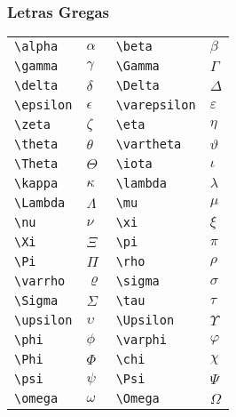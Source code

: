\documentclass{gjvnq-livreto}
\begin{document}
\subsubsection{Letras Gregas}
\begin{codeBox}
\begin{longtable}{ll|ll}
\verb|\alpha| & $\alpha$ & \verb|\beta| & $\beta$ \\
\verb|\gamma| & $\gamma$ & \verb|\Gamma| & $\Gamma$ \\
\verb|\delta| & $\delta$ & \verb|\Delta| & $\Delta$ \\
\verb|\epsilon| & $\epsilon$ & \verb|\varepsilon| & $\varepsilon$ \\
\verb|\zeta| & $\zeta$ & \verb|\eta| & $\eta$ \\
\verb|\theta| & $\theta$ & \verb|\vartheta| & $\vartheta$\\
\verb|\Theta| & $\Theta$ & \verb|\iota| & $\iota$ \\
\verb|\kappa| & $\kappa$ & \verb|\lambda| & $\lambda$ \\
\verb|\Lambda| & $\Lambda$ & \verb|\mu| & $\mu$ \\
\verb|\nu| & $\nu$ & \verb|\xi| & $\xi$ \\
\verb|\Xi| & $\Xi$ & \verb|\pi| & $\pi$ \\
\verb|\Pi| & $\Pi$ & \verb|\rho| & $\rho$ \\
\verb|\varrho| & $\varrho$ & \verb|\sigma| & $\sigma$ \\
\verb|\Sigma| & $\Sigma$ & \verb|\tau| & $\tau$ \\
\verb|\upsilon| & $\upsilon$ & \verb|\Upsilon| & $\Upsilon$ \\
\verb|\phi| & $\phi$ & \verb|\varphi| & $\varphi$ \\
\verb|\Phi| & $\Phi$ & \verb|\chi| & $\chi$ \\
\verb|\psi| & $\psi$ & \verb|\Psi| & $\Psi$ \\
\verb|\omega| & $\omega$ & \verb|\Omega| & $\Omega$ \\
\end{longtable}
\end{codeBox}
\end{document}
